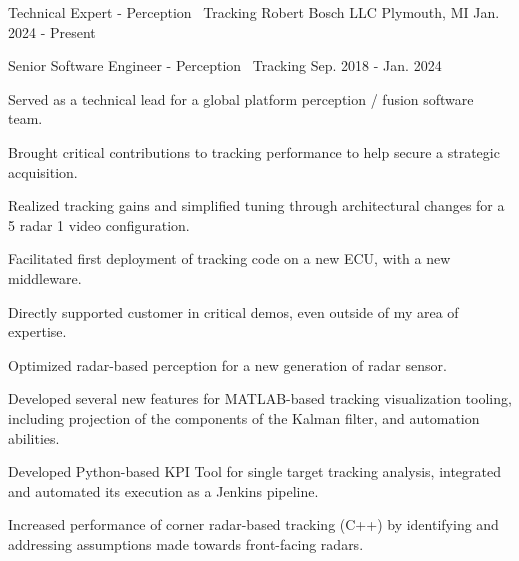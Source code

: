 

\begin{cventries}

  \cventry
    {Technical Expert - Perception \textbar\ Tracking} %
    {Robert Bosch LLC} %
    {Plymouth, MI} %
    {Jan. 2024 - Present} %
    {
    }

  \cventrytitle
    {Senior Software Engineer - Perception \textbar\ Tracking} %
    {} %
    {} %
    {Sep. 2018 - Jan. 2024} %
    {
      \begin{cvitems} %
        \item {Served as a technical lead for a global platform perception / fusion software team.}
        \item {Brought critical contributions to tracking performance to help secure a strategic acquisition.}
        \item {Realized tracking gains and simplified tuning through architectural changes for a 5 radar 1 video configuration.}
        \item {Facilitated first deployment of tracking code on a new ECU, with a new middleware.}
        \item {Directly supported customer in critical demos, even outside of my area of expertise.}
        \item {Optimized radar-based perception for a new generation of radar sensor.}
        \item {Developed several new features for MATLAB-based tracking visualization tooling, including projection of the components of the Kalman filter, and automation abilities.}
        \item {Developed Python-based KPI Tool for single target tracking analysis, integrated and automated its execution as a Jenkins pipeline.}
        \item {Increased performance of corner radar-based tracking (C++) by identifying and addressing assumptions made towards front-facing radars.}

\end{cvitems}}
\end{cventries}
